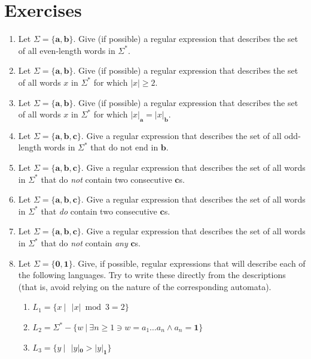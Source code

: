 \section*{Exercises}
\begin{enumerate}[{6.}1.]
\item Let $\Sigma=\{\pmb{a},\pmb{b}\}$. Give (if possible) a regular expression
that describes the set of all even-length words in $\Sigma^*$.

\item Let $\Sigma=\{\pmb{a},\pmb{b}\}$. Give (if possible) a regular expression
that describes the set of all words $x$ in $\Sigma^*$ for which $|x| \geq 2$.

\item Let $\Sigma=\{\pmb{a},\pmb{b}\}$. Give (if possible) a regular expression
that describes the set of all words $x$ in $\Sigma^*$ for which $|x|_{\pmb{a}} =
|x|_{\pmb{b}}$.

\item Let $\Sigma=\{\pmb{a},\pmb{b},\pmb{c}\}$. Give a regular expression that
describes the set of all odd-length words in $\Sigma^*$ that do not end in $\pmb{b}$.

\item Let $\Sigma=\{\pmb{a},\pmb{b},\pmb{c}\}$. Give a regular expression that
describes the set of all words in $\Sigma^*$ that do \emph{not} contain
two consecutive $\pmb{c}$s. 

\item Let $\Sigma=\{\pmb{a},\pmb{b},\pmb{c}\}$. Give a regular expression that
describes the set of all words in $\Sigma^*$ that \emph{do} contain
two consecutive $\pmb{c}$s.

\item Let $\Sigma=\{\pmb{a},\pmb{b},\pmb{c}\}$. Give a regular expression that
describes the set of all words in $\Sigma^*$ that do \emph{not} contain
\emph{any} $\pmb{c}$s.

\item Let $\Sigma=\{\pmb{0},\pmb{1}\}$. Give, if possible, regular expressions
that will describe each of the following languages. Try to write these directly
from the descriptions (that is, avoid relying on the nature of the corresponding
automata).
\begin{enumerate}
\item $L_1 = \{x\ |\ \ \ |x| \bmod{3} = 2\}$
\item $L_2 = \Sigma^* - \{w\ |\ \exists n \geq 1 \ni w = a_1\ldots a_n \wedge a_n
	= \pmb{1}\}$
\item $L_3 = \{y\ |\ \ \ |y|_{\pmb{0}} > |y|_{\pmb{1}}\}$
\end{enumerate}


\end{enumerate}
